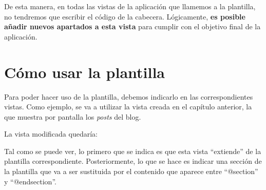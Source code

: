 De esta manera, en todas las vistas de la aplicación que llamemos a la plantilla, no tendremos que escribir el código de la cabecera. Lógicamente, \textbf{es posible añadir nuevos apartados a esta vista} para cumplir con el objetivo final de la aplicación.

\section{Cómo usar la plantilla}

Para poder hacer uso de la plantilla, debemos indicarlo en las correspondientes vistas. Como ejemplo, se va a utilizar la vista creada en el capítulo anterior, la que muestra por pantalla los \textit{posts} del blog.

La vista modificada quedaría:


Tal como se puede ver, lo primero que se indica es que esta vista “extiende” de la plantilla correspondiente. Posteriormente, lo que se hace es indicar una sección de la plantilla que va a ser sustituida por el contenido que aparece entre “@section” y “@endsection”.